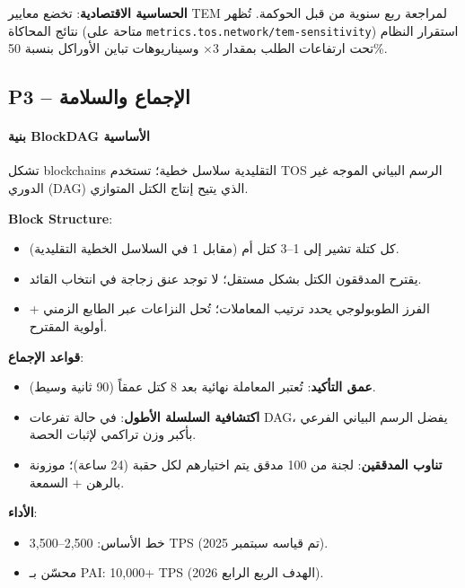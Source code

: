 \documentclass[11pt]{article}
\begin{document}
\textbf{الحساسية الاقتصادية}: تخضع معايير TEM لمراجعة ربع سنوية من قبل الحوكمة. تُظهر نتائج المحاكاة (متاحة على \texttt{metrics.tos.network/tem-sensitivity}) استقرار النظام تحت ارتفاعات الطلب بمقدار 3$\times$ وسيناريوهات تباين الأوراكل بنسبة 50\%.

\subsection{P3 -- الإجماع والسلامة}
\label{sec:pillar-consensus}

\paragraph{بنية BlockDAG الأساسية}
تشكل blockchains التقليدية سلاسل خطية؛ تستخدم TOS الرسم البياني الموجه غير الدوري (DAG) الذي يتيح إنتاج الكتل المتوازي.

\textbf{Block Structure}:
\begin{itemize}[noitemsep]
  \item كل كتلة تشير إلى 1--3 كتل أم (مقابل 1 في السلاسل الخطية التقليدية).
  \item يقترح المدققون الكتل بشكل مستقل؛ لا توجد عنق زجاجة في انتخاب القائد.
  \item الفرز الطوبولوجي يحدد ترتيب المعاملات؛ تُحل النزاعات عبر الطابع الزمني + أولوية المقترح.
\end{itemize}

\textbf{قواعد الإجماع}:
\begin{itemize}[noitemsep]
  \item \textbf{عمق التأكيد}: تُعتبر المعاملة نهائية بعد 8 كتل عمقاً (90 ثانية وسيط).
  \item \textbf{اكتشافية السلسلة الأطول}: في حالة تفرعات DAG، يفضل الرسم البياني الفرعي بأكبر وزن تراكمي لإثبات الحصة.
  \item \textbf{تناوب المدققين}: لجنة من 100 مدقق يتم اختيارهم لكل حقبة (24 ساعة)؛ موزونة بالرهن + السمعة.
\end{itemize}

\textbf{الأداء}:
\begin{itemize}[noitemsep]
  \item خط الأساس: 2,500--3,500 TPS (تم قياسه سبتمبر 2025).
  \item محسّن بـ PAI: 10,000+ TPS (الهدف الربع الرابع 2026).
\end{itemize}
\end{document}
